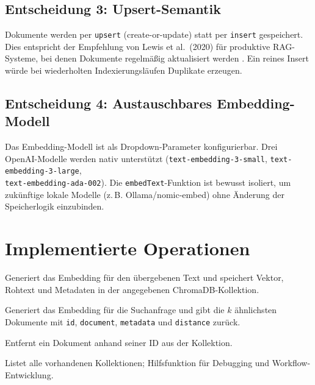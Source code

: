 \documentclass[12pt,a4paper,oneside]{report}
\begin{document}
\subsection{Entscheidung 3: Upsert-Semantik}

Dokumente werden per \texttt{upsert} (create-or-update) statt per \texttt{insert}
gespeichert. Dies entspricht der Empfehlung von Lewis et al.\ (2020) für produktive
\ac{RAG}-Systeme, bei denen Dokumente regelmäßig aktualisiert werden \cite{lewis2020retrieval}.
Ein reines Insert würde bei wiederholten Indexierungsläufen Duplikate erzeugen.

\subsection{Entscheidung 4: Austauschbares Embedding-Modell}

Das Embedding-Modell ist als Dropdown-Parameter konfigurierbar. Drei OpenAI-Modelle
werden nativ unterstützt (\texttt{text-embedding-3-small}, \texttt{text-embedding-3-large}, \\
\texttt{text-embedding-ada-002}). Die \texttt{embedText}-Funktion ist bewusst
isoliert, um zukünftige lokale Modelle (z.\,B. Ollama/nomic-embed) ohne Änderung der
Speicherlogik einzubinden.

\section{Implementierte Operationen}

\begin{description}[leftmargin=3cm]
  \item[\texttt{upsert}] Generiert das Embedding für den übergebenen Text und
    speichert Vektor, Rohtext und Metadaten in der angegebenen ChromaDB-Kollektion.

  \item[\texttt{query}] Generiert das Embedding für die Suchanfrage und gibt die
    $k$ ähnlichsten Dokumente mit \texttt{id}, \texttt{document}, \texttt{metadata}
    und \texttt{distance} zurück.

  \item[\texttt{delete}] Entfernt ein Dokument anhand seiner ID aus der Kollektion.

  \item[\texttt{listCollections}] Listet alle vorhandenen Kollektionen; Hilfsfunktion
    für Debugging und Workflow-Entwicklung.
\end{description}
\end{document}
